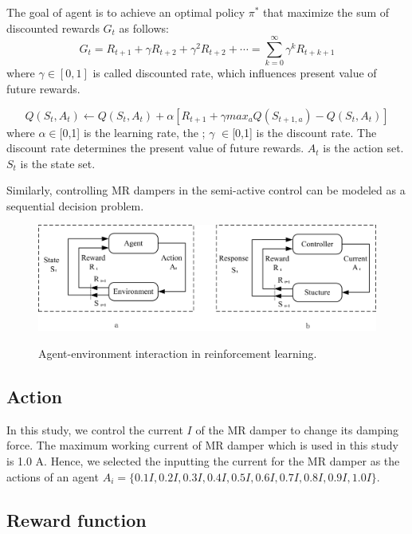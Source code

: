 The goal of agent is to achieve an optimal policy $\pi^*$ that maximize the sum of discounted rewards $G_t$ as follows:
\begin{equation}
G_{t}=R_{t+1}+\gamma R_{t+2}+\gamma^2 R_{t+2}+\cdots=\sum_{k=0}^{\infty} \gamma^{k} R_{t+k+1}
\end{equation}
where $\gamma \in [0,1]$ is called discounted rate, which influences present value of future rewards. 


\begin{equation}Q(S_t,A_t) \leftarrow Q(S_t,A_t)+\alpha [R_{t+1} + \gamma max_{a}Q(S_{t+1,a})-Q(S_t,A_t)]\end{equation}
where $\alpha \in$[0,1] is the learning rate, the ; $\gamma$ $\in$[0,1] is the discount rate. The discount rate determines the present value of future rewards. $A_t$ is the action set. $S_t$ is the state set.


Similarly, controlling MR dampers in the semi-active control can be modeled as a sequential decision problem. 

\begin{figure}[!h]
\centering
{\includegraphics[width=1.0\textwidth]{interaction.jpg}} 
\caption{Agent-environment interaction in reinforcement learning.} 
\label{interaction} 
\end{figure} 
\subsection{Action}

In this study, we control the current $I$ of the MR damper to change its damping force. The maximum working current of MR damper which is used in this study is 1.0 A. Hence, we selected the inputting the current for the MR damper as the actions of an agent $A_i=\{0.1I, 0.2I, 0.3I, 0.4I, 0.5I, 0.6I, 0.7I, 0.8I, 0.9I, 1.0I\}$. 

\subsection{Reward function}


